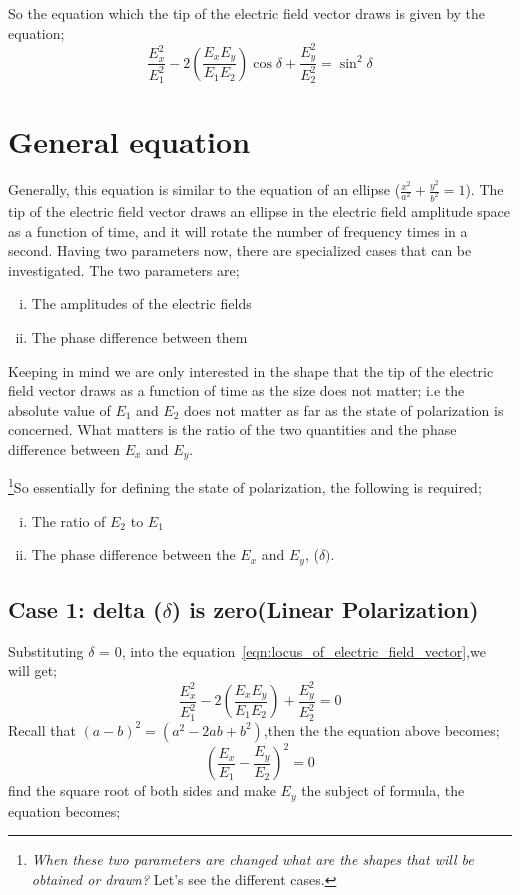 So the equation which the tip of the electric field vector draws is given by the equation;
\begin{equation}
\frac{E_{x}^2}{E_{1}^2} -2(\frac{E_{x}E_{y}}{E_{1}E_{2}})\cos\delta + \frac{E_{y}^2}{E_{2}^2} =\sin^2 \delta
\label{eqn:locus_of_electric_field_vector}
\end{equation}

\section{General equation }
Generally, this equation is similar to the equation of an ellipse ($\frac{x^2}{a^2} + \frac{y^2}{b^2} = 1 $). The tip of the electric field vector draws an ellipse in the electric field amplitude space as a function of time, and it will rotate the number of frequency times in a second. Having two parameters now, there are specialized cases that can be investigated. The two parameters are;
\begin{enumerate}[(i)]
\item The amplitudes of the electric fields
\item The phase difference between them
\end{enumerate}
Keeping in mind we are only interested in the shape that the tip of the electric field vector draws as a function of time as the size does not matter; i.e the absolute value of $ E_1 $ and $ E_2 $ does not matter as far as the state of polarization is concerned. What matters is the ratio of the two quantities and the phase difference between $ E_x $ and $ E_y $.

\footnote{
\emph{When these two parameters are changed what are the shapes that will be obtained or drawn?} Let's see the different cases.
}So essentially for defining the state of polarization, the following is required;
\begin{enumerate}[(i)] 
\item The ratio of $ E_2 $ to $ E_1 $
\item The phase difference between the $ E_x $ and $ E_y $, ($\delta)$.
\end{enumerate}

\subsection{Case 1: delta ($\delta $) is zero(Linear Polarization)}
Substituting $\delta$ = 0, into the equation~\eqref{eqn:locus_of_electric_field_vector},we will get;
\begin{equation}
\frac{E_{x}^2}{E_{1}^2} -2(\frac{E_{x}E_{y}}{E_{1}E_{2}}) + \frac{E_{y}^2}{E_{2}^2} = 0
\end{equation}
Recall that ${(a - b)}^2 = (a^2 -2ab +b^2)$,then the the equation above becomes;
\begin{equation}
{(\frac{E_x}{E_1} - \frac{E_y}{E_2})}^2 = 0
\end{equation}
find the square root of both sides and make $ E_y $ the subject of formula, the equation becomes;

